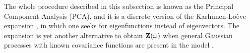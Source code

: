 The whole procedure described in this subsection is known as the Principal Component Analysis (PCA), and it is a discrete version of the Karhunen-Lo\`{e}ve expansion \cite{loeve1978}, in which one seeks for eigenfunctions instead of eigenvectors. The expansion is yet another alternative to obtain $\mathbf{Z}(\omega)$ when general Gaussian processes with known covariance functions are present in the model \cite{xiu2010}.
